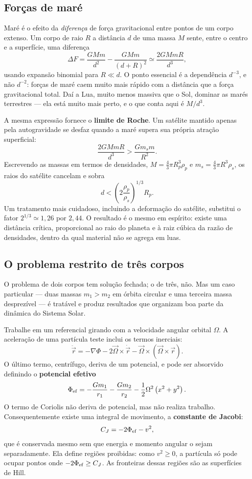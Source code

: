 \documentclass[11pt,a4paper]{article}
\begin{document}
\subsection*{Forças de maré}

Maré é o efeito da \emph{diferença} de força gravitacional entre pontos de um corpo extenso. Um corpo de raio $R$ a distância $d$ de uma massa $M$ sente, entre o centro e a superfície, uma diferença
\[
\Delta F=\frac{GMm}{d^{2}}-\frac{GMm}{(d+R)^{2}}
\simeq\frac{2GMmR}{d^{3}},
\]
usando expansão binomial para $R\ll d$. O ponto essencial é a dependência $d^{-3}$, e não $d^{-2}$: forças de maré caem muito mais rápido com a distância que a força gravitacional total. Daí a Lua, muito menos massiva que o Sol, dominar as marés terrestres --- ela está muito mais perto, e o que conta aqui é $M/d^{3}$.

A mesma expressão fornece o \textbf{limite de Roche}. Um satélite mantido apenas pela autogravidade se desfaz quando a maré supera sua própria atração superficial:
\[
\frac{2GMmR}{d^{3}}>\frac{Gm_sm}{R^{2}}.
\]
Escrevendo as massas em termos de densidades, $M=\frac{4}{3}\pi R_p^{3}\rho_p$ e $m_s=\frac{4}{3}\pi R^{3}\rho_s$, os raios do satélite cancelam e sobra
\[
d<\left(2\frac{\rho_p}{\rho_s}\right)^{1/3}R_p.
\]
Um tratamento mais cuidadoso, incluindo a deformação do satélite, substitui o fator $2^{1/3}\simeq1{,}26$ por $2{,}44$. O resultado é o mesmo em espírito: existe uma distância crítica, proporcional ao raio do planeta e à raiz cúbica da razão de densidades, dentro da qual material não se agrega em luas.


\subsection*{O problema restrito de três corpos}

O problema de dois corpos tem solução fechada; o de três, não. Mas um caso particular --- duas massas $m_1>m_2$ em órbita circular e uma terceira massa desprezível --- é tratável e produz resultados que organizam boa parte da dinâmica do Sistema Solar.

Trabalhe em um referencial girando com a velocidade angular orbital $\Omega$. A aceleração de uma partícula teste inclui os termos inerciais:
\[
\ddot{\vec{r}}=-\nabla\Phi-2\vec{\Omega}\times\dot{\vec{r}}-\vec{\Omega}\times(\vec{\Omega}\times\vec{r}).
\]
O último termo, centrífugo, deriva de um potencial, e pode ser absorvido definindo o \textbf{potencial efetivo}
\[
\Phi_{\rm ef}=-\frac{Gm_1}{r_1}-\frac{Gm_2}{r_2}-\frac{1}{2}\Omega^{2}\left(x^{2}+y^{2}\right).
\]
O termo de Coriolis não deriva de potencial, mas não realiza trabalho. Consequentemente existe uma integral de movimento, a \textbf{constante de Jacobi}:
\[
C_J=-2\Phi_{\rm ef}-v^{2},
\]
que é conservada mesmo sem que energia e momento angular o sejam separadamente. Ela define regiões proibidas: como $v^{2}\ge0$, a partícula só pode ocupar pontos onde $-2\Phi_{\rm ef}\ge C_J$. As fronteiras dessas regiões são as superfícies de Hill.
\end{document}
